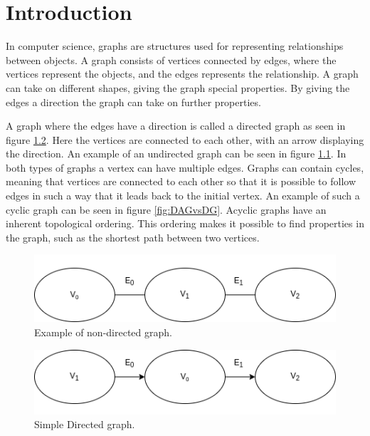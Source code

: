 \chapter{Introduction}
\label{cha:Introduction}

In computer science, graphs are structures used for representing relationships between objects. A graph consists of vertices connected by edges, where the vertices represent the objects, and the edges represents the relationship. A graph can take on different shapes, giving the graph special properties. By giving the edges a direction the graph can take on further properties.

A graph where the edges have a direction is called a directed graph as seen in figure \ref{fig:DAG}. Here the vertices are connected to each other, with an arrow displaying the direction. An example of an undirected graph can be seen in figure \ref{fig:DAGvsAG}. In both types of graphs a vertex can have multiple edges. Graphs can contain cycles, meaning that vertices are connected to each other so that it is possible to follow edges in such a way that it leads back to the initial vertex. An example of such a cyclic graph can be seen in figure \ref{fig:DAGvsDG}. Acyclic graphs have an inherent topological ordering. This ordering makes it possible to find properties in the graph, such as the shortest path between two vertices.

\begin{figure}[h]
    \centering
    \includegraphics[scale=0.5]{figs/simpleAG.png}
    \caption{Example of non-directed graph.}
    \label{fig:DAGvsAG}
\end{figure}

\begin{figure}[h]
    \centering
    \includegraphics[scale=0.5]{figs/simpleDAG.png}
    \caption{Simple Directed graph.}
    \label{fig:DAG}
\end{figure}


